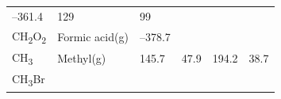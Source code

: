 \documentclass[
]{book}
\theoremstyle{definition}
\theoremstyle{definition}
\theoremstyle{definition}
\theoremstyle{remark}
\begin{document}
\begin{longtable}[]{@{}llllll@{}}
\begin{minipage}[t]{0.15\columnwidth}
--361.4\strut
\end{minipage} & \begin{minipage}[t]{0.14\columnwidth}\raggedright
129\strut
\end{minipage} & \begin{minipage}[t]{0.14\columnwidth}\raggedright
99\strut
\end{minipage}\tabularnewline
\begin{minipage}[t]{0.07\columnwidth}\raggedright
CH\textsubscript{2}O\textsubscript{2}\strut
\end{minipage} & \begin{minipage}[t]{0.17\columnwidth}\raggedright
Formic acid(g)\strut
\end{minipage} & \begin{minipage}[t]{0.15\columnwidth}\raggedright
--378.7\strut
\end{minipage} & \begin{minipage}[t]{0.15\columnwidth}\raggedright
\strut
\end{minipage} & \begin{minipage}[t]{0.14\columnwidth}\raggedright
\strut
\end{minipage} & \begin{minipage}[t]{0.14\columnwidth}\raggedright
\strut
\end{minipage}\tabularnewline
\begin{minipage}[t]{0.07\columnwidth}\raggedright
CH\textsubscript{3}\strut
\end{minipage} & \begin{minipage}[t]{0.17\columnwidth}\raggedright
Methyl(g)\strut
\end{minipage} & \begin{minipage}[t]{0.15\columnwidth}\raggedright
145.7\strut
\end{minipage} & \begin{minipage}[t]{0.15\columnwidth}\raggedright
47.9\strut
\end{minipage} & \begin{minipage}[t]{0.14\columnwidth}\raggedright
194.2\strut
\end{minipage} & \begin{minipage}[t]{0.14\columnwidth}\raggedright
38.7\strut
\end{minipage}\tabularnewline
\begin{minipage}[t]{0.07\columnwidth}\raggedright
CH\textsubscript{3}Br\strut
\end{minipage} & \begin{minipage}[t]{0.17\columnwidth}\raggedright

\end{minipage}
\end{longtable}
\end{document}

